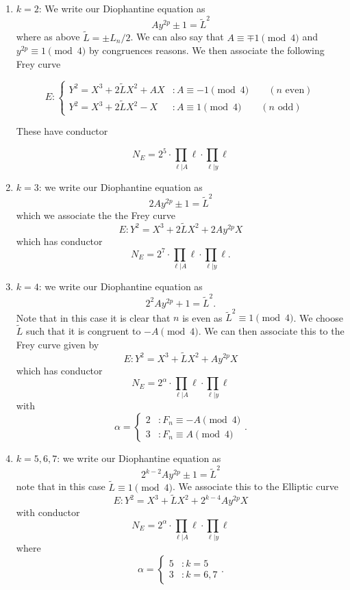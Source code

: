 \documentclass[12pt]{article}
\begin{document}
\begin{enumerate}
\begin{enumerate}

\item $k = 2$:  We write our Diophantine equation as
\[ A y^{2p} \pm 1 = \tilde{L}^2 \]
where as above $\tilde{L} = \pm L_n/2$.  We can also say that $A \equiv \mp 1 \pmod{4}$ and $y^{2p} \equiv 1 \pmod{4}$ by congruences reasons.  We then associate the following Frey curve

\[ E : \begin{cases} Y^2 = X^3 + 2 \tilde{L}X^2 + A X & : A \equiv -1 \pmod{4} \qquad (n \text{ even}) \\  Y^2 = X^3 + 2 \tilde{L}X^2 - X & : A \equiv 1 \pmod{4} \qquad (n \text{ odd}) \end{cases} \]

These have conductor

\[ N_E =  2^5 \cdot \prod_{\ell |  A} \ell \cdot \prod_{\ell | y} \ell \]


\item $k =3$: we write our Diophantine equation as
\[ 2A y^{2p} \pm 1 = \tilde{L}^2 \]
which we associate the the Frey curve
\[ E : Y^2 = X^3 + 2\tilde{L}X^2 + 2Ay^{2p} X \]
which has conductor
\[ N_E = 2^7 \cdot \prod_{\ell | A} \ell \cdot \prod_{\ell | y} \ell. \]

\item $k = 4$: we write our Diophantine equation as
\[ 2^2A y^{2p} + 1  = \tilde{L}^2. \]
Note that in this case it is clear that $n$ is even as $\tilde{L}^2 \equiv 1 \pmod{4}$.  We choose $\tilde{L}$ such that it is congruent to $-A \pmod{4}$.  We can then associate this to the Frey curve given by
\[ E: Y^2 = X^3 + \tilde{L}X^2 + Ay^{2p}X \]
which has conductor
\[N_E = 2^\alpha \cdot \prod_{\ell | A} \ell \cdot \prod_{\ell | y} \ell \]
with 
\[ \alpha = \begin{cases} 2 & : F_n \equiv -A \pmod{4} \\ 3 & : F_n \equiv  A \pmod{4} \end{cases} .\]


\item $k=5, 6, 7$: we write our Diophantine equation as
\[ 2^{k-2}A y^{2p} \pm 1 = \tilde{L}^2 \]
note that in this case $\tilde{L} \equiv 1 \pmod{4}$.  We associate this to the Elliptic curve
\[ E: Y^2 = X^3 + \tilde{L}X^2 + 2^{k-4}A y^{2p} X \]
with conductor
\[ N_E = 2^\alpha \cdot \prod_{\ell | A} \ell \cdot \prod_{\ell | y} \ell \]
where
\[ \alpha = \begin{cases} 5 & : k = 5 \\ 3 & : k = 6,7 \end{cases} .\]


\end{enumerate}
\end{enumerate}
\end{document}
